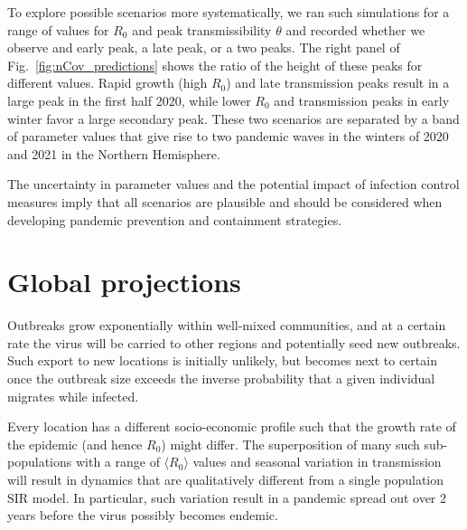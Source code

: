 \documentclass[rmp, reprint, superscriptaddress, floatfix,amsmath]{revtex4-1}
\begin{document}
To explore possible scenarios more systematically, we ran such simulations for a range of values for $R_0$ and peak transmissibility $\theta$ and recorded whether we observe and early peak, a late peak, or a two peaks. 
The right panel of Fig.~\ref{fig:nCov_predictions} shows the ratio of the height of these peaks for different values.
Rapid growth (high $R_0$) and late transmission peaks result in a large peak in the first half 2020, while lower $R_0$ and transmission peaks in early winter favor a large secondary peak. 
These two scenarios are separated by a band of parameter values that give rise to two pandemic waves in the winters of 2020 and 2021 in the Northern Hemisphere.

The uncertainty in parameter values and the potential impact of infection control measures imply that all scenarios are plausible and should be considered when developing pandemic prevention and containment strategies.


\section{Global projections}
Outbreaks grow exponentially within well-mixed communities, and at a certain rate the virus will be carried to other regions and potentially seed new outbreaks. 
Such export to new locations is initially unlikely, but becomes next to certain once the outbreak size exceeds the inverse probability that a given individual migrates while infected.

Every location has a different socio-economic profile such that the growth rate of the epidemic (and hence $R_0$) might differ. 
The superposition of many such sub-populations with a range of $\langle R_0 \rangle$ values and seasonal variation in transmission will result in dynamics that are qualitatively different from a single population SIR model. 
In particular, such variation result in a pandemic spread out over 2 years before the virus possibly becomes endemic. 
\end{document}
